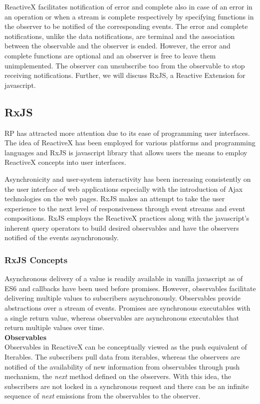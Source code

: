 ReactiveX facilitates notification of error and complete also in case of an error in an operation or when a stream is complete respectively by specifying functions in the observer to be notified of the corresponding events. The error and complete notifications, unlike the data notifications, are terminal and the association between the observable and the observer is ended. However, the error and complete functions are optional and an observer is free to leave them unimplemented. The observer can unsubscribe too from the observable to stop receiving notifications. Further, we will discuss RxJS, a Reactive Extension for javascript.

\subsection{RxJS}
RP has attracted more attention due to its ease of programming user interfaces\cite{Schuster:2016:RPR:2892664.2892666}\cite{Bainomugisha:2013:SRP:2501654.2501666}. The idea of ReactiveX has been employed for various platforms and programming languages and RxJS is javascript library that allows users the means to employ ReactiveX concepts into user interfaces. 

Asynchronicity and user-system interactivity \cite{Kristaly:2008:WTW:1389586.1389663} has been increasing consistently on the user interface of web applications especially with the introduction of Ajax technologies\cite{ajaxANewWayToWP} on the web pages. RxJS makes an attempt to take the user experience to the next level of responsiveness through event streams and event compositions. RxJS employs the ReactiveX practices along with the javascript's inherent query operators to build desired observables and have the observers notified of the events asynchronously.

\subsubsection{RxJS Concepts}
Asynchronous delivery of a value is readily available in vanilla javascript as of ES6\cite{ECMAScript} and callbacks have been used before promises. However, observables\cite{observable} facilitate delivering multiple values to subscribers asynchronously. Observables provide abstractions over a stream of events. Promises are synchronous executables with a single return value, whereas observables are asynchronous executables that return multiple values over time. 
\\
\textbf{Observables}
\\
Observables in ReactiveX can be conceptually viewed as the push equivalent of Iterables\cite{reactiveX}. The subscribers pull data from iterables, whereas the observers are notified of the availability of new information from observables through push mechanism, the \textit{next} method defined on the observers. With this idea, the subscribers are not locked in a synchronous request and there can be an infinite sequence of \textit{next} emissions from the observables to the observer.

